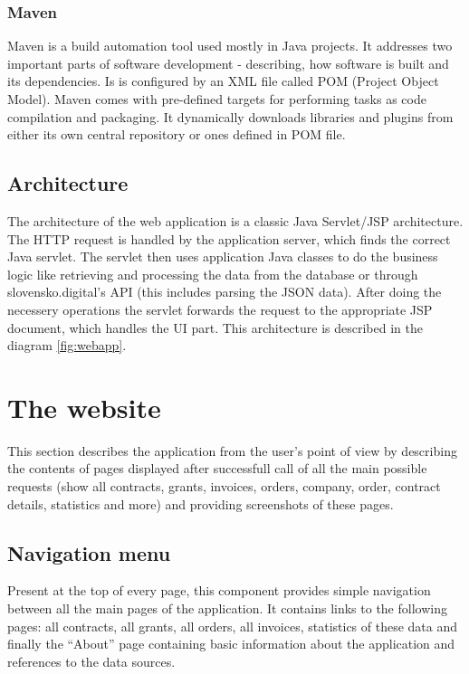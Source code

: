 \documentclass[thesis=B,english]{FITthesis}[2012/06/26]
\begin{document}
	\subsubsection{Maven}
	Maven is a build automation tool used mostly in Java projects. It addresses two important parts of software development - describing, how software is built and its dependencies. Is is configured by an XML file called POM (Project Object Model). Maven comes with pre-defined targets for performing tasks as code compilation and packaging. It dynamically downloads libraries and plugins from either its own central repository or ones defined in POM file.
	
	\subsection{Architecture}
	The architecture of the web application is a classic Java Servlet/JSP architecture. The HTTP request is handled by the application server, which finds the correct Java servlet. The servlet then uses application Java classes to do the business logic like retrieving and processing the data from the database or through slovensko.digital's API (this includes parsing the JSON data). After doing the necessery operations the servlet forwards the request to the appropriate JSP document, which handles the UI part. This architecture is described in the diagram \ref{fig:webapp}.


	\section{The website}
	This section describes the application from the user's point of view by describing the contents of pages displayed after successfull call of all the main possible requests (show all contracts, grants, invoices, orders, company, order, contract details, statistics and more) and providing screenshots of these pages.
	
	\subsection{Navigation menu}
	Present at the top of every page, this component provides simple navigation between all the main pages of the application. It contains links to the following pages: all contracts, all grants, all orders, all invoices, statistics of these data and finally the ``About'' page containing basic information about the application and references to the data sources.
\end{document}
